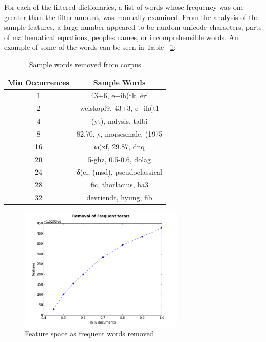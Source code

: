For each of the filtered dictionaries, a list of words whose frequency was one greater than the filter amount, was manually examined.
From the analysis of the sample features, a large number appeared to be random unicode characters, parts of mathematical equations, peoples names, or incomprehensible words.
An example of some of the words can be seen in Table ~\ref{table:infrequentWords}:

\begin{table}[h]
    \centering
    \begin{tabular}{|c c|}
         \hline
         Min Occurrences & Sample Words \\ [0.5ex]
         \hline\hline
         1 &  43+6, e−ih(tk, éri\\
         2 &  weiskopf9, 43+3, e−ih(t1\\
         4 &  (yt), nalysis, talbi\\
         8 &  82.70.-y, morsesmale, (1975\\
         16 &  ω(xf, 29.87, dnq\\
         20 &  5-ghz, 0.5-0.6, dolag\\
         24 &  δ(ei, (msd), pseudoclassical\\
         28 &  fic, thorlacius, ha3\\
         32 &  devriendt, hyung, fib\\ [1ex]
         \hline
    \end{tabular}
    \caption{Sample words removed from corpus}
    \label{table:infrequentWords}
\end{table}

\begin{figure}[h]
    \centering
        \includegraphics[width=0.7\textwidth]{Figures/CorpusFilterFrequent.png}
    \caption{Feature space as frequent words removed}
    \label{fig:FilterFrequent}
\end{figure}

